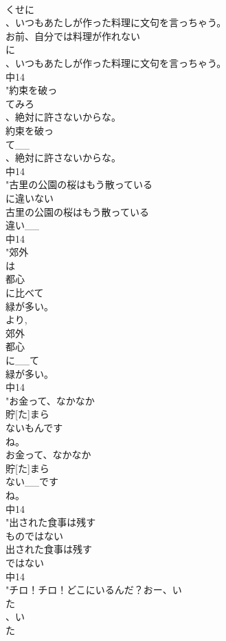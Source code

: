 \documentclass[8pt]{extreport}
\begin{document}
\begin{CJK}{UTF8}{min}
\\	くせに
\\	、いつもあたしが作った料理に文句を言っちゃう。
\\	お前、自分では料理が作れない
\\	に
\\	、いつもあたしが作った料理に文句を言っちゃう。
\\	中14
\\	"約束を破っ
\\	てみろ
\\	、絶対に許さないからな。
\\	約束を破っ
\\	て__
\\	、絶対に許さないからな。
\\	中14
\\	"古里の公園の桜はもう散っている
\\	に違いない
\\	古里の公園の桜はもう散っている
\\	違い__
\\	中14
\\	"郊外
\\	は
\\	都心
\\	に比べて
\\	緑が多い。
\\	より, 
\\	郊外
\\	都心
\\	に__て
\\	緑が多い。
\\	中14
\\	"お金って、なかなか
\\	貯[た]まら
\\	ないもんです
\\	ね。
\\	お金って、なかなか
\\	貯[た]まら
\\	ない__です
\\	ね。
\\	中14
\\	"出された食事は残す
\\	ものではない
\\	出された食事は残す
\\	ではない
\\	中14
\\	"チロ！チロ！どこにいるんだ？おー、い
\\	た
\\	、い
\\	た

\end{CJK}
\end{document}
